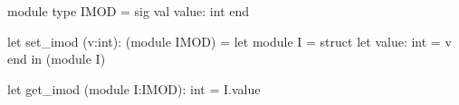 \begin{ocaml}
  module type IMOD =
    sig
      val value: int
    end

  let set_imod (v:int): (module IMOD) =
    let module I =
      struct
        let value: int = v
      end in
    (module I)

  let get_imod (module I:IMOD): int =
    I.value
\end{ocaml}

